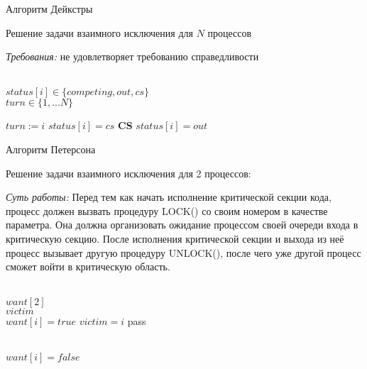 \begin{algorithm}
\caption{Алгоритм Дейкстры}
Решение задачи взаимного исключения для $N$ процессов

\textit{Требования:} не удовлетворяет требованию справедливости

\label{algDijkstra}
\begin{algorithmic}
\Ensure \\$status[i] \in \{competing, out, cs\}$ \\
$turn \in \{1,...N\}$ 

\Repeat

      \State $turn := i$
    \EndIf
  \EndWhile
  \State $status[i] = cs$
\State \textbf{CS}
\State $status[i] = out$
\end{algorithmic}
\end{algorithm}

\begin{algorithm}
\caption{Алгоритм Петерсона}
Решение задачи взаимного исключения для 2 процессов: 

\textit{Суть работы:} Перед тем как начать исполнение критической секции кода, процесс должен вызвать процедуру LOCK() со своим номером в качестве параметра. Она должна организовать ожидание процессом своей очереди входа в критическую секцию. После исполнения критической секции и выхода из неё процесс вызывает другую процедуру UNLOCK(), после чего уже другой процесс сможет войти в критическую область.
\label{algPeterson}
\begin{algorithmic} 
\Ensure \\$want[2]$ \\ 
$victim$ \\ 
  \State $want[i] = true$  
  \State $victim = i$
    \State pass
  \EndWhile
\EndProcedure

\\
  \State $want[i] = false$
\EndProcedure
\end{algorithmic}
\end{algorithm}